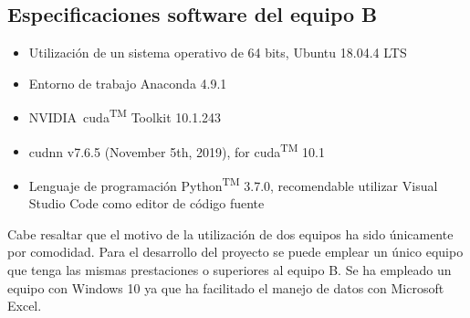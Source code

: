 \subsection{Especificaciones software del equipo B}
\label{subsec:especificaciones-software-equipob}
\begin{itemize}
    \item Utilización de un sistema operativo de 64 bits, Ubuntu 18.04.4 LTS
    \item Entorno de trabajo Anaconda 4.9.1
    \item NVIDIA\textregistered\ \gls{cuda}\textsuperscript{TM} Toolkit 10.1.243 
    \item \gls{cudnn} v7.6.5 (November 5th, 2019), for \gls{cuda}\textsuperscript{TM} 10.1
    \item Lenguaje de programación Python\textsuperscript{TM} 3.7.0, recomendable utilizar Visual Studio Code como editor de código fuente
\end{itemize}

Cabe resaltar que el motivo de la utilización de dos equipos ha sido únicamente por comodidad. Para el desarrollo del proyecto se puede emplear un único equipo que tenga las mismas prestaciones o superiores al equipo B. Se ha empleado un equipo con Windows 10 ya que ha facilitado el manejo de datos con Microsoft Excel.
